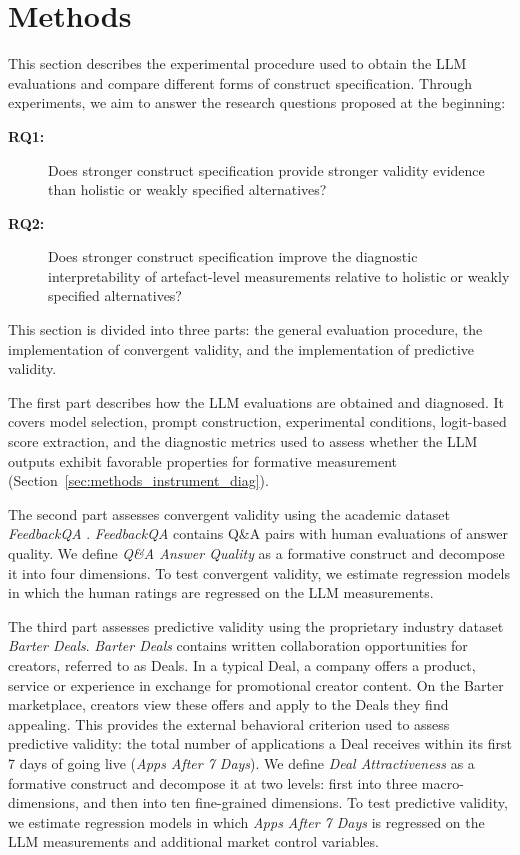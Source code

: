 
\section{Methods}\label{sec:methods}

This section describes the experimental procedure used to obtain the LLM evaluations and compare different forms of construct specification. Through experiments, we aim to answer the research questions proposed at the beginning: 

\begin{description}
    \item[\textbf{RQ1:}] Does stronger construct specification provide stronger validity evidence than holistic or weakly specified alternatives?
    \item[\textbf{RQ2:}] Does stronger construct specification improve the diagnostic interpretability of artefact-level measurements relative to holistic or weakly specified alternatives?
\end{description}

This section is divided into three parts: the general evaluation procedure, the implementation of convergent validity, and the implementation of predictive validity.

The first part describes how the LLM evaluations are obtained and diagnosed. It covers model selection, prompt construction, experimental conditions, logit-based score extraction, and the diagnostic metrics used to assess whether the LLM outputs exhibit favorable properties for formative measurement (Section~\ref{sec:methods_instrument_diag}).

The second part assesses convergent validity using the academic dataset \textit{FeedbackQA} \citep{li_using_2022}. \textit{FeedbackQA} contains Q\&A pairs with human evaluations of answer quality. We define \textit{Q\&A Answer Quality} as a formative construct and decompose it into four dimensions. To test convergent validity, we estimate regression models in which the human ratings are regressed on the LLM measurements.

The third part assesses predictive validity using the proprietary industry dataset \textit{Barter Deals}. \textit{Barter Deals} contains written collaboration opportunities for creators, referred to as Deals. In a typical Deal, a company offers a product, service or experience in exchange for promotional creator content. On the Barter marketplace, creators view these offers and apply to the Deals they find appealing. This provides the external behavioral criterion used to assess predictive validity: the total number of applications a Deal receives within its first 7 days of going live (\textit{Apps After 7 Days}). We define \textit{Deal Attractiveness} as a formative construct and decompose it at two levels: first into three macro-dimensions, and then into ten fine-grained dimensions. To test predictive validity, we estimate regression models in which \textit{Apps After 7 Days} is regressed on the LLM measurements and additional market control variables.

